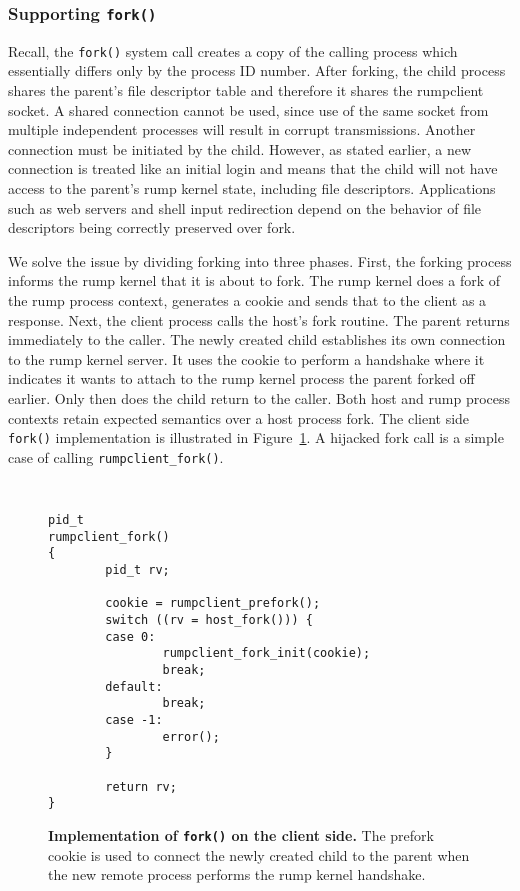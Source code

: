 \subsubsection*{Supporting \texttt{fork()}}

Recall, the \verb+fork()+ system call creates a copy of the calling
process which essentially differs only by the process ID number.
After forking, the child process shares the
parent's file descriptor table and therefore it shares the rumpclient socket.  A shared connection cannot be used, since use of
the same socket from multiple independent processes will result in
corrupt transmissions.  Another connection must be initiated by the child.
However, as stated earlier, a new connection is
treated like an initial login and means that the child will not
have access to the parent's rump kernel state, including file
descriptors.  Applications such as web servers and shell input
redirection depend on the behavior of file descriptors being correctly
preserved over fork.

We solve the issue by dividing forking into three phases.  First,
the forking process informs the rump kernel that it is about to
fork.  The rump kernel does a fork of the rump process context,
generates a cookie and sends that to the client as a response.
Next, the client process calls the host's fork routine.  The parent
returns immediately to the caller.  The newly created child
establishes its own connection to the rump kernel server.  It uses
the cookie to perform a handshake where it indicates it wants to
attach to the rump kernel process the parent forked off earlier.
Only then does the child return to the caller.  Both host
and rump process contexts retain expected semantics over a host
process fork.  The client side \texttt{fork()} implementation is
illustrated in Figure~\ref{fig:rumpclient_fork}.  A hijacked fork
call is a simple case of calling \verb+rumpclient_fork()+.

\begin{figure}[t]
{\tt \scriptsize
\begin{verbatim}
pid_t
rumpclient_fork()
{
        pid_t rv;

        cookie = rumpclient_prefork();
        switch ((rv = host_fork())) {
        case 0:
                rumpclient_fork_init(cookie);
                break;
        default:
                break;
        case -1:
                error();
        }

        return rv;
}
\end{verbatim}}
\caption[Implementation of \texttt{fork()} on the client side]{
\textbf{Implementation of \texttt{fork()} on the client side.}
The prefork cookie is used to connect the newly created child to the
parent when the new remote process performs the rump kernel handshake.
}
\label{fig:rumpclient_fork}
\end{figure}

